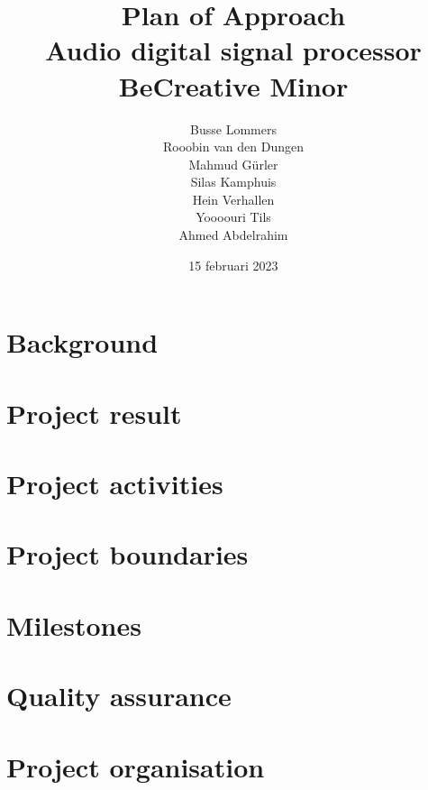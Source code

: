 \documentclass[11pt, a4paper]{report}
\begin{document}
\title{%
  Plan of Approach \\
  \large Audio digital signal processor \\
  BeCreative Minor}
\author{Busse Lommers \\
Rooobin van den Dungen \\
Mahmud Gürler \\
Silas Kamphuis \\
Hein Verhallen \\
Yoooouri Tils \\
Ahmed Abdelrahim}
\date{15 februari 2023}
\maketitle
\tableofcontents

\chapter{Background}
	
	
\chapter{Project result}
	
	
\chapter{Project activities}
	

\chapter{Project boundaries}
	
	
\chapter{Milestones}
	

\chapter{Quality assurance}
	

\chapter{Project organisation}
	
\end{document}
